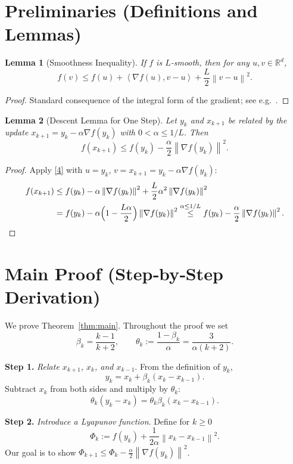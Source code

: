 \documentclass[11pt]{article}
\newtheorem{lemma}{Lemma}
\newcommand{\norm}[1]{\left\|#1\right\|}
\newcommand{\inner}[2]{\left\langle #1,#2\right\rangle}
\newcommand{\grad}{\nabla}
\begin{document}
\newpage
\section*{Preliminaries (Definitions and Lemmas)}
\begin{lemma}[Smoothness Inequality]\label{lem:smooth}
If $f$ is $L$‑smooth, then for any $u,v\in\mathbb{R}^d$,
\[
f(v)\le f(u)+\inner{\grad f(u)}{v-u}+\frac{L}{2}\norm{v-u}^{2}.
\tag{4}
\]
\end{lemma}
\begin{proof}
Standard consequence of the integral form of the gradient; see e.g.~\cite{nesterov2004introductory}.
\end{proof}

\begin{lemma}[Descent Lemma for One Step]\label{lem:descent}
Let $y_k$ and $x_{k+1}$ be related by the update $x_{k+1}=y_k-\alpha\grad f(y_k)$ with $0<\alpha\le 1/L$. Then
\[
f(x_{k+1})\le f(y_k)-\frac{\alpha}{2}\norm{\grad f(y_k)}^{2}.
\tag{5}
\]
\end{lemma}
\begin{proof}
Apply \eqref{4} with $u=y_k$, $v=x_{k+1}=y_k-\alpha\grad f(y_k)$:
\[
\begin{aligned}
f(x_{k+1}) &\le f(y_k)-\alpha\norm{\grad f(y_k)}^{2}
+\frac{L}{2}\alpha^{2}\norm{\grad f(y_k)}^{2}\\
&= f(y_k)-\alpha\Bigl(1-\frac{L\alpha}{2}\Bigr)\norm{\grad f(y_k)}^{2}
\stackrel{\alpha\le 1/L}{\le} f(y_k)-\frac{\alpha}{2}\norm{\grad f(y_k)}^{2}.
\end{aligned}
\]
\end{proof}

\section*{Main Proof (Step‑by‑Step Derivation)}
We prove Theorem~\ref{thm:main}. Throughout the proof we set
\[
\beta_k=\frac{k-1}{k+2},\qquad
\theta_k:=\frac{1-\beta_k}{\alpha}= \frac{3}{\alpha(k+2)} .
\tag{6}
\]

\noindent\textbf{Step 1.} \emph{Relate $x_{k+1}$, $x_k$, and $x_{k-1}$}.  
From the definition of $y_k$,
\[
y_k = x_k + \beta_k (x_k-x_{k-1}) .
\tag{7}
\]
Subtract $x_k$ from both sides and multiply by $\theta_k$:
\[
\theta_k (y_k-x_k)=\theta_k\beta_k (x_k-x_{k-1}).
\tag{8}
\]

\noindent\textbf{Step 2.} \emph{Introduce a Lyapunov function}.  
Define for $k\ge 0$
\[
\Phi_k := f(y_k)+\frac{1}{2\alpha}\norm{x_k-x_{k-1}}^{2}.
\tag{9}
\]
Our goal is to show $\Phi_{k+1}\le \Phi_k-\frac{\alpha}{2}\norm{\grad f(y_k)}^{2}$.
\end{document}

